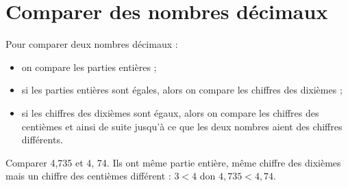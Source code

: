 \vspace*{-5mm}
\section{Comparer des nombres décimaux}
\vspace*{-5mm}
\begin{methode}
   Pour comparer deux nombres décimaux :
   \begin{itemize}
      \item on compare les parties entières ;
      \item si les parties entières sont égales, alors on compare les chiffres des dixièmes ;
      \item si les chiffres des dixièmes sont égaux, alors on compare les chiffres des centièmes et ainsi de suite jusqu’à ce que les deux nombres aient des chiffres différents.
   \end{itemize}
   \exercice
      Comparer 4,735 et 4, 74.  
   \correction
      Ils ont même partie entière, même chiffre des dixièmes mais un chiffre des centièmes différent : $3<4$ don $4,735<4,74$.
\end{methode}
